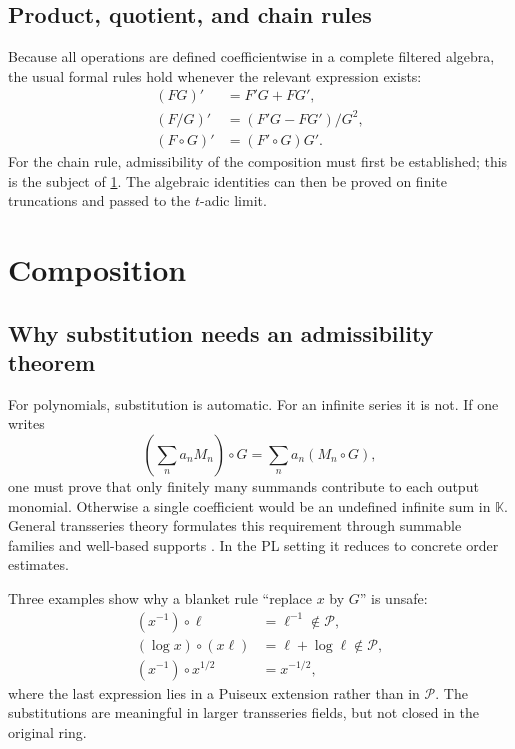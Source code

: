 \documentclass[11pt,oneside]{article}
\numberwithin{equation}{section}
\theoremstyle{definition}
\newcommand{\K}{\mathbb K}
\newcommand{\PL}{\mathscr P}
\begin{document}
\subsection{Product, quotient, and chain rules}

Because all operations are defined coefficientwise in a complete filtered
algebra, the usual formal rules hold whenever the relevant expression exists:
\begin{align}
 (FG)'&=F'G+FG',\label{eq:product-rule}\\
 (F/G)'&=(F'G-FG')/G^2,\label{eq:quotient-rule}\\
 (F\circ G)'&=(F'\circ G)G'.\label{eq:chain-rule-preview}
\end{align}
For the chain rule, admissibility of the composition must first be established;
this is the subject of \cref{sec:composition}.  The algebraic identities can then
be proved on finite truncations and passed to the \(t\)-adic limit.

\section{Composition}\label{sec:composition}

\subsection{Why substitution needs an admissibility theorem}

For polynomials, substitution is automatic.  For an infinite series it is not.
If one writes
\[
  \left(\sum_n a_nM_n\right)\circ G
  =\sum_n a_n(M_n\circ G),
\]
one must prove that only finitely many summands contribute to each output
monomial.  Otherwise a single coefficient would be an undefined infinite sum in
\(\K\).  General transseries theory formulates this requirement through
summable families and well-based supports \cite{EdgarBeginners,EdgarComposition,
VanDerHoeven2006}.  In the PL setting it reduces to concrete order estimates.

Three examples show why a blanket rule ``replace \(x\) by \(G\)'' is unsafe:
\begin{align*}
  (x^{-1})\circ\ell&=\ell^{-1}\notin\PL,\\
  (\log x)\circ(x\ell)&=\ell+\log\ell\notin\PL,\\
  (x^{-1})\circ x^{1/2}&=x^{-1/2},
\end{align*}
where the last expression lies in a Puiseux extension rather than in \(\PL\).
The substitutions are meaningful in larger transseries fields, but not closed in
the original ring.
\end{document}
